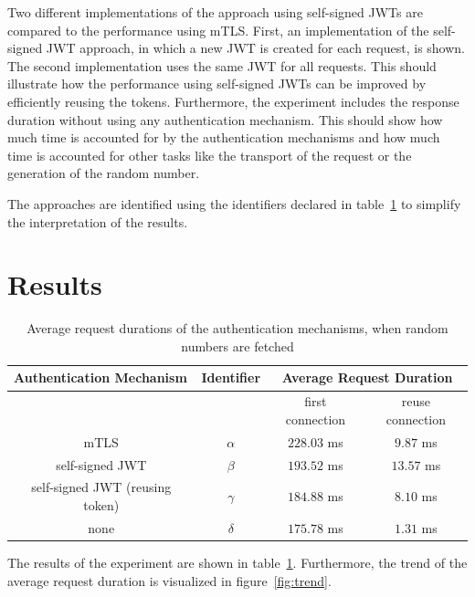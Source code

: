 Two different implementations of the approach using self-signed JWTs are compared to the performance using mTLS.
First, an implementation of the self-signed JWT approach, in which a new JWT is created for each request, is shown.
The second implementation uses the same JWT for all requests.
This should illustrate how the performance using self-signed JWTs can be improved by efficiently reusing the tokens.
Furthermore, the experiment includes the response duration without using any authentication mechanism.
This should show how much time is accounted for by the authentication mechanisms and how much time is accounted for other tasks like the transport of the request or the generation of the random number.

The approaches are identified using the identifiers declared in table~\ref{tab:experiment_case_1} to simplify the interpretation of the results.

\section{Results}

\begin{table}[H]
	\centering
\begin{tabular}{c|c|cc}
	\multicolumn{1}{l|}{\textbf{Authentication Mechanism}} & \textbf{Identifier} & \multicolumn{2}{c}{\textbf{Average Request Duration}} \\ \hline
	\multicolumn{1}{c|}{} & & \multicolumn{1}{c|}{first connection} & reuse connection \\ \hline
	mTLS & $\alpha$ & \multicolumn{1}{c|}{$228.03$ ms} & $9.87$ ms \\ \hline
	self-signed JWT & $\beta$ & \multicolumn{1}{c|}{$193.52$ ms} & $13.57$ ms \\ \hline
	self-signed JWT (reusing token) & $\gamma$ & \multicolumn{1}{c|}{$184.88$ ms} & $8.10$ ms \\ \hline 
	none & $\delta$ & \multicolumn{1}{c|}{$175.78$ ms} & $1.31$ ms
\end{tabular}
\caption{Average request durations of the authentication mechanisms, when random numbers are fetched}
\label{tab:experiment_case_1}
\end{table}

The results of the experiment are shown in table~\ref{tab:experiment_case_1}.
Furthermore, the trend of the average request duration is visualized in figure~\ref{fig:trend}.

